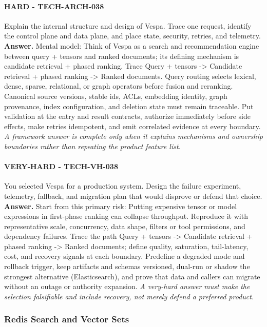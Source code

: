 \paragraph{HARD - TECH-ARCH-038} Explain the internal structure and design of Vespa. Trace one request, identify the control plane and data plane, and place state, security, retries, and telemetry.
\textbf{Answer.} Mental model: Think of Vespa as a search and recommendation engine between query + tensors and ranked documents; its defining mechanism is candidate retrieval + phased ranking. Trace Query + tensors -> Candidate retrieval + phased ranking -> Ranked documents. Query routing selects lexical, dense, sparse, relational, or graph operators before fusion and reranking. Canonical source versions, stable ids, ACLs, embedding identity, graph provenance, index configuration, and deletion state must remain traceable. Put validation at the entry and result contracts, authorize immediately before side effects, make retries idempotent, and emit correlated evidence at every boundary.
\textit{A framework answer is complete only when it explains mechanisms and ownership boundaries rather than repeating the product feature list.}
\paragraph{VERY-HARD - TECH-VH-038} You selected Vespa for a production system. Design the failure experiment, telemetry, fallback, and migration plan that would disprove or defend that choice.
\textbf{Answer.} Start from this primary risk: Putting expensive tensor or model expressions in first-phase ranking can collapse throughput. Reproduce it with representative scale, concurrency, data shape, filters or tool permissions, and dependency failures. Trace the path Query + tensors -> Candidate retrieval + phased ranking -> Ranked documents; define quality, saturation, tail-latency, cost, and recovery signals at each boundary. Predefine a degraded mode and rollback trigger, keep artifacts and schemas versioned, dual-run or shadow the strongest alternative (Elasticsearch), and prove that data and callers can migrate without an outage or authority expansion.
\textit{A very-hard answer must make the selection falsifiable and include recovery, not merely defend a preferred product.}
\subsubsection*{Redis Search and Vector Sets}

